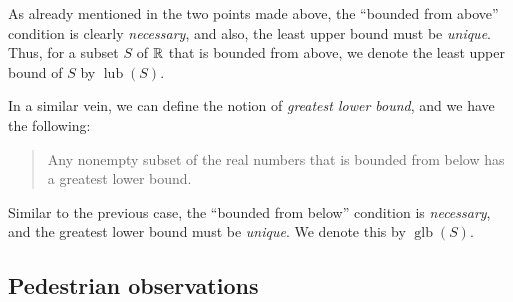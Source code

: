 \documentclass{amsart}
\begin{document}
As already mentioned in the two points made above, the ``bounded from
above'' condition is clearly {\em necessary}, and also, the least
upper bound must be {\em unique}. Thus, for a subset $S$ of $\mathbb{R}$ that
is bounded from above, we denote the least upper bound of $S$ by
$\operatorname{lub}(S)$.

In a similar vein, we can define the notion of {\em greatest lower
bound}, and we have the following:

\begin{quote}
  Any nonempty subset of the real numbers that is bounded from below
  has a greatest lower bound.
\end{quote}

Similar to the previous case, the ``bounded from below'' condition is
{\em necessary}, and the greatest lower bound must be {\em unique}. We
denote this by $\operatorname{glb}(S)$.

\subsection{Pedestrian observations}
\end{document}
